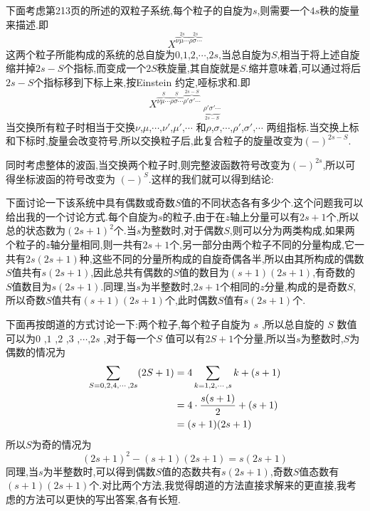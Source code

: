 下面考虑第213页的所述的双粒子系统,每个粒子的自旋为$s$,则需要一个$4s$秩的旋量来描述.即
\begin{equation}
  X^{\overbrace{\nu\mu\cdots}^{2s}\overbrace{\rho\sigma\cdots}^{2s}}
\end{equation}
这两个粒子所能构成的系统的总自旋为$0$,$1$,$2$,$\cdots$,$2s$,当总自旋为$S$,相当于将上述自旋缩并掉$2s-S$个指标,而变成一个$2S$秩旋量,其自旋就是$S$.缩并意味着,可以通过将后$2s-S$个指标移到下标上来,按Einstein 约定,哑标求和.即
\begin{equation}
  X^{\overbrace{\nu\mu\cdots}^{S}\overbrace{\rho\sigma\cdots}^{S}
  \overbrace{\rho'\sigma'\cdots}^{2s-S}}\ _{\underbrace{\rho'\sigma'\cdots}_{2s-S}}
\end{equation}
当交换所有粒子时相当于交换$\nu$,$\mu$,$\cdots$,$\nu'$,$\mu'$,$\cdots$ 和$\rho$,$\sigma$,$\cdots$,$\rho'$,$\sigma'$,$\cdots$ 两组指标.当交换上标和下标时,旋量会改变符号,所以交换粒子后,此复合粒子的旋量改变为$(-)^{2s-S}$.

同时考虑整体的波函,当交换两个粒子时,则完整波函数符号改变为$(-)^{2s}$,所以可得坐标波函的符号改变为 $(-)^S$.这样的我们就可以得到结论:

下面讨论一下该系统中具有偶数或奇数$S$值的不同状态各有多少个.这个问题我可以给出我的一个讨论方式.每个自旋为$s$的粒子,由于在$z$轴上分量可以有$2s+1$个,所以总的状态数为$(2s+1)^2$个.当$s$为整数时,对于偶数$S$,则可以分为两类构成,如果两个粒子的$z$轴分量相同,则一共有$2s+1$个,另一部分由两个粒子不同的分量构成,它一共有$2s(2s+1)$种,这些不同的分量所构成的自旋奇偶各半,所以由其所构成的偶数$S$值共有$s(2s+1)$,因此总共有偶数的$S$值的数目为$(s+1)(2s+1)$,有奇数的 $S$值数目为$s(2s+1)$.同理,当$s$为半整数时,$2s+1$个相同的$z$分量,构成的是奇数$S$,所以奇数$S$值共有$(s+1)(2s+1)$个,此时偶数$S$值有$s(2s+1)$个.

下面再按朗道的方式讨论一下:两个粒子,每个粒子自旋为 $s$ ,所以总自旋的 $S$ 数值可以为$0$ ,$1$ ,$2$ ,$3$ ,$\cdots$,$2s$ ,对于每一个$S$ 值可以有$2S+1$个分量,所以当$s$为整数时,$S$为偶数的情况为
\begin{align}
  \sum_{S=0,2,4,\cdots, 2s}(2S+1)
  &=4\sum_{k=1,2,\cdots , s} k + (s+1)\notag\\
  &=4\cdot \frac{s(s+1)}{2}+(s+1)\notag\\
  &=(s+1)(2s+1)
\end{align}
所以$S$为奇的情况为
\begin{equation}
  (2s+1)^2-(s+1)(2s+1)=s(2s+1)
\end{equation}
同理,当$s$为半整数时,可以得到偶数$S$值的态数共有$s(2s+1)$,奇数$S$值态数有$(s+1)(2s+1)$个.对比两个方法,我觉得朗道的方法直接求解来的更直接,我考虑的方法可以更快的写出答案,各有长短.

